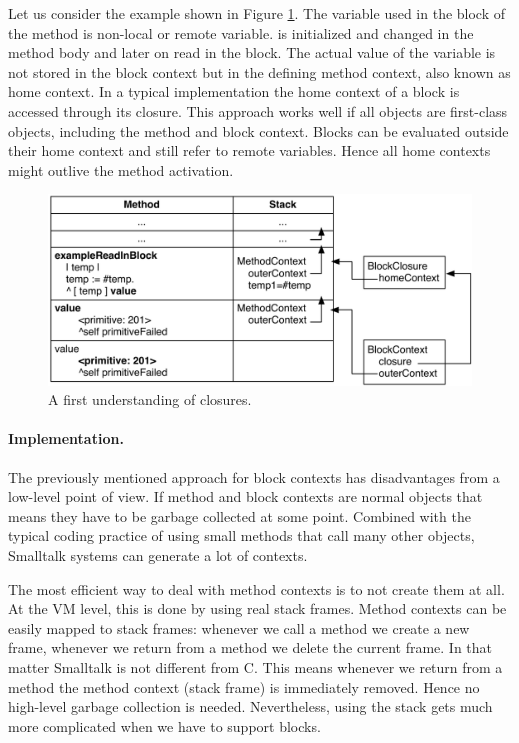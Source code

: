 \documentclass[a4paper,10pt,twoside]{book}
\begin{document}
Let us consider the example shown in Figure \ref{fig:BlockWithFullClosures}.
The  variable used in the block of the  method is non-local or remote variable.
 is initialized and changed in the method body and later on read in the block.
The actual value of the variable is not stored in the block context but in the defining method context, also known as home context.
In a typical implementation the home context of a block is accessed through its closure.
This approach works well if all objects are first-class objects, including the method and block context.
Blocks can be evaluated outside their home context and still refer to remote variables.
Hence all home contexts might outlive the method activation.

\begin{figure}
  \begin{center}
    \includegraphics[width=\textwidth]{BlockWithFullClosures}
    \caption{A first understanding of closures.\label{fig:BlockWithFullClosures}}
  \end{center}
\end{figure}

\paragraph{Implementation.} The previously mentioned approach for block contexts has disadvantages from a low-level point of view.
If method and block contexts are normal objects that means they have to be garbage collected at some point.
Combined with the typical coding practice of using small methods that call many other objects, Smalltalk systems can generate a lot of contexts.

The most efficient way to deal with method contexts is to not create them at all.
At the VM level, this is done by using real stack frames.
Method contexts can be easily mapped to stack frames: whenever we call a method we create a new frame, whenever we return from a method we delete the current frame.
In that matter Smalltalk is not different from C.
This means whenever we return from a method the method context (stack frame) is immediately removed.
Hence no high-level garbage collection is needed.
Nevertheless, using the stack gets much more complicated when we have to support blocks.
\end{document}
